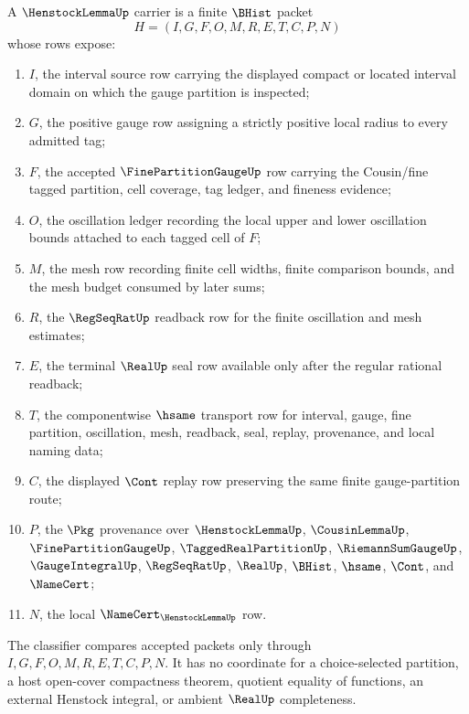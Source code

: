 \begin{definition}
\label{def:henstock-lemma-carrier}
A $\HenstockLemmaUp$ carrier is a finite $\BHist$ packet
$$
H=(I,G,F,O,M,R,E,T,C,P,N)
$$
whose rows expose:
\begin{enumerate}
\item $I$, the interval source row carrying the displayed compact or located interval domain on which the gauge partition is inspected;
\item $G$, the positive gauge row assigning a strictly positive local radius to every admitted tag;
\item $F$, the accepted $\FinePartitionGaugeUp$ row carrying the Cousin/fine tagged partition, cell coverage, tag ledger, and fineness evidence;
\item $O$, the oscillation ledger recording the local upper and lower oscillation bounds attached to each tagged cell of $F$;
\item $M$, the mesh row recording finite cell widths, finite comparison bounds, and the mesh budget consumed by later sums;
\item $R$, the $\RegSeqRatUp$ readback row for the finite oscillation and mesh estimates;
\item $E$, the terminal $\RealUp$ seal row available only after the regular rational readback;
\item $T$, the componentwise $\hsame$ transport row for interval, gauge, fine partition, oscillation, mesh, readback, seal, replay, provenance, and local naming data;
\item $C$, the displayed $\Cont$ replay row preserving the same finite gauge-partition route;
\item $P$, the $\Pkg$ provenance over $\HenstockLemmaUp$, $\CousinLemmaUp$, $\FinePartitionGaugeUp$, $\TaggedRealPartitionUp$, $\RiemannSumGaugeUp$, $\GaugeIntegralUp$, $\RegSeqRatUp$, $\RealUp$, $\BHist$, $\hsame$, $\Cont$, and $\NameCert$;
\item $N$, the local $\NameCert_{\HenstockLemmaUp}$ row.
\end{enumerate}
The classifier compares accepted packets only through $I,G,F,O,M,R,E,T,C,P,N$. It has no coordinate for a choice-selected partition, a host open-cover compactness theorem, quotient equality of functions, an external Henstock integral, or ambient $\RealUp$ completeness.
\end{definition}

